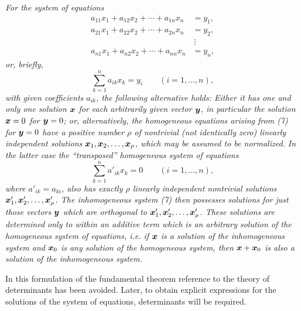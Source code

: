 \emph{For the system of equations}
\[
\begin{aligned}
a_{11}x_1+a_{12}x_2+\cdots+a_{1n}x_n&=y_1,\\
a_{21}x_1+a_{22}x_2+\cdots+a_{2n}x_n&=y_2,\\
&\ \vdots\\
a_{n1}x_1+a_{n2}x_2+\cdots+a_{nn}x_n&=y_n,
\end{aligned}
\]
\emph{or, briefly,}
\begin{equation*}
\sum_{k=1}^{n}a_{ik}x_k=y_i\qquad(i=1,\ldots,n),
\tag{7}
\end{equation*}
\emph{with given coefficients $a_{ik}$, the following alternative holds: Either it has one and only one solution $\bm{x}$ for each arbitrarily given vector $\bm{y}$, in particular the solution $\bm{x}=0$ for $\bm{y}=0$; or, alternatively, the homogeneous equations arising from (7) for $\bm{y}=0$ have a positive number $\rho$ of nontrivial (not identically zero) linearly independent solutions $\bm{x}_1,\bm{x}_2,\ldots,\bm{x}_\rho$, which may be assumed to be normalized. In the latter case the ``transposed'' homogeneous system of equations}
\begin{equation*}
\sum_{k=1}^{n}a'_{ik}x_k=0\qquad(i=1,\ldots,n),
\tag{8}
\end{equation*}
\emph{where $a'_{ik}=a_{ki}$, also has exactly $\rho$ linearly independent nontrivial solutions $\bm{x}'_1,\bm{x}'_2,\ldots,\bm{x}'_\rho$. The inhomogeneous system (7) then possesses solutions for just those vectors $\bm{y}$ which are orthogonal to $\bm{x}'_1,\bm{x}'_2,\ldots,\bm{x}'_\rho$. These solutions are determined only to within an additive term which is an arbitrary solution of the homogeneous system of equations, i.e. if $\bm{x}$ is a solution of the inhomogeneous system and $\bm{x}_0$ is any solution of the homogeneous system, then $\bm{x}+\bm{x}_0$ is also a solution of the inhomogeneous system.}

In this formulation of the fundamental theorem reference to the theory of determinants has been avoided. Later, to obtain explicit expressions for the solutions of the system of equations, determinants will be required.

